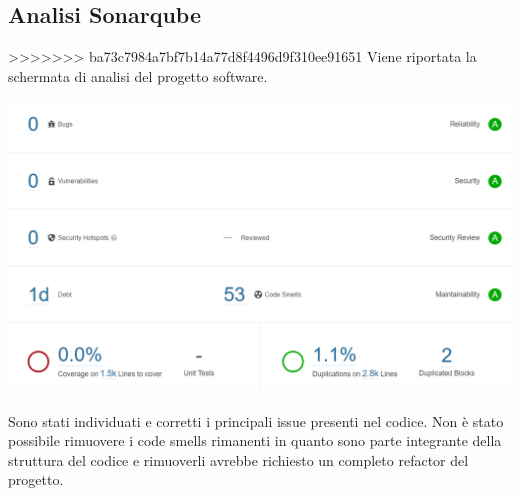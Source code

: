 \documentclass[a4paper, titlepage]{article}
\begin{document}
\subsection{Analisi Sonarqube}
>>>>>>> ba73c7984a7bf7b14a77d8f4496d9f310ee91651
Viene riportata la schermata di analisi del progetto software.\\\\
\includegraphics[scale=0.60]{Immagini/form/Sonarqube.png}
\\\\
Sono stati individuati e corretti i principali issue presenti nel codice.
Non è stato possibile rimuovere i code smells rimanenti in quanto sono parte integrante della struttura del codice e rimuoverli avrebbe richiesto un completo refactor del progetto.
\end{document}
